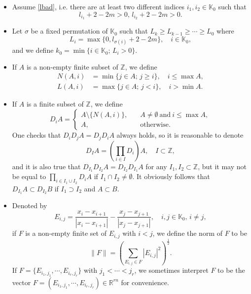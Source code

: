 \documentclass[11pt,reqno]{amsart}
\numberwithin{equation}{section}
\theoremstyle{definition}
\begin{document}
\begin{itemize}
	
	\item Assume \eqref{lbad}, i.e. there are at least two different indices $i_1,i_2\in\mathbb{K}_0$ such that
	\begin{equation}\label{assumptionl}
		l_{i_1}+2-2m>0,\,l_{i_2}+2-2m>0.
	\end{equation}
	\item  Let $\sigma$ be a fixed permutation of $\mathbb{K}_0$ such that $L_k\geq L_{k-1}\geq\cdots\geq L_0$ where
	\begin{equation}\label{defL_i}
		L_i=\max\{0,l_{\sigma(i)}+2-2m\},\quad i\in\mathbb{K}_0,
	\end{equation}
	and we define $k_0=\min\{i\in\mathbb{K}_0;\,L_i>0\}$.
	\item If $A$ is a non-empty finite subset of $\mathbb{Z}$, we define
	\begin{equation}\label{NL}
		\begin{split}
			N(A,i)&=\min\{j\in A;\,j\geq i\},\quad i\leq\max A,\\
			L(A,i)&=\max\{j\in A;\,j<i\},\quad i>\min A.
		\end{split}
	\end{equation}
	\item If $A$ is a finite subset of $\mathbb{Z}$, we define
	\begin{equation}\label{DiA}
		D_iA=\begin{cases}
			A\setminus\{N(A,i)\},\quad&A\neq\emptyset~\text{and}~i\leq\max A,\\
			A,&\text{otherwise}.
		\end{cases}
	\end{equation}
	One checks that $D_iD_jA=D_jD_iA$ always holds, so it is reasonable to denote
	\begin{equation}\label{DIA}
		D_IA=\left(\prod_{i\in I}D_i\right)A,\quad I\subset\mathbb{Z},
	\end{equation}
	and it is also true that $D_{I_1}D_{I_2}A=D_{I_2}D_{I_1}A$ for any $I_1,I_2\subset\mathbb{Z}$, but it may not be equal to $\prod_{i\in I_1\cup I_2}D_iA$ if $I_1\cap I_2\neq\emptyset$. It obviously follows that $D_{I_1}A\subset D_{I_2}B$ if $I_1\supset I_2$ and $A\subset B$.
	
	\item Denoted by
	\begin{equation}\label{Eij}
		E_{i,j}=\frac{x_i-x_{i+1}}{|x_i-x_{i+1}|}-\frac{x_j-x_{j+1}}{|x_j-x_{j+1}|},\quad i,j\in\mathbb{K}_0,\,i\neq j,
	\end{equation}
	if $F$ is a non-empty finite set of $E_{i,j}$ with $i<j$, we define the norm of $F$ to be
	\begin{equation}\label{defFnorm}
		\|F\|=\left(\sum_{E_{i,j}\in F}|E_{i,j}|^2\right)^\frac12.
	\end{equation}
	If $F=\{E_{i_1,j_1},\cdots,E_{i_r,j_r}\}$ with $j_1<\cdots<j_r$, we sometimes interpret $F$ to be the vector $F=(E_{i_1,j_1},\cdots,E_{i_r,j_r})\in\mathbb{R}^{rn}$ for convenience.
\end{itemize}
\end{document}
